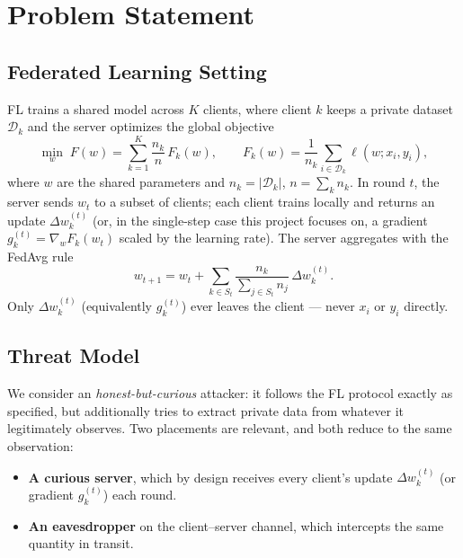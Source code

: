\chapter{Problem Statement}
\label{chap:problem-statement}

\section{Federated Learning Setting}
\label{sec:fl-setting}

FL trains a shared model across $K$ clients, where client $k$ keeps a
private dataset $\mathcal{D}_k$ and the server optimizes the global
objective
\begin{equation}
\min_{w} \; F(w) = \sum_{k=1}^{K} \frac{n_k}{n} \, F_k(w),
\qquad
F_k(w) = \frac{1}{n_k} \sum_{i \in \mathcal{D}_k} \ell(w; x_i, y_i),
\label{eq:fl-objective}
\end{equation}
where $w$ are the shared parameters and $n_k = |\mathcal{D}_k|$, $n = \sum_k n_k$.
In round $t$, the server sends $w_t$ to a subset of clients; each client
trains locally and returns an update $\Delta w_k^{(t)}$ (or, in the
single-step case this project focuses on, a gradient
$g_k^{(t)} = \nabla_w F_k(w_t)$ scaled by the learning rate). The server
aggregates with the FedAvg rule
\begin{equation}
w_{t+1} = w_t + \sum_{k \in S_t} \frac{n_k}{\sum_{j \in S_t} n_j} \, \Delta w_k^{(t)}.
\label{eq:fedavg}
\end{equation}
Only $\Delta w_k^{(t)}$ (equivalently $g_k^{(t)}$) ever leaves the client ---
never $x_i$ or $y_i$ directly.

\section{Threat Model}
\label{sec:threat-model}

We consider an \emph{honest-but-curious} attacker: it follows the FL
protocol exactly as specified, but additionally tries to extract private
data from whatever it legitimately observes. Two placements are relevant,
and both reduce to the same observation:

\begin{itemize}[leftmargin=1.6em]
  \item \textbf{A curious server}, which by design receives every client's
  update $\Delta w_k^{(t)}$ (or gradient $g_k^{(t)}$) each round.
  \item \textbf{An eavesdropper} on the client--server channel, which
  intercepts the same quantity in transit.
\end{itemize}

